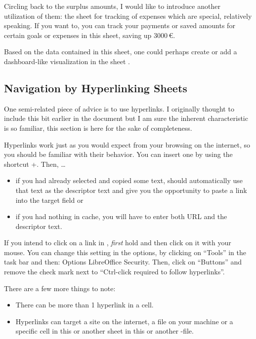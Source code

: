 Circling back to the surplus amounts, I would like to introduce another utilization of them: the sheet for tracking of expenses which are special, relatively speaking.
If you want to, you can track your payments or saved amounts for certain goals or expenses in this sheet, \ie saving up 3000\,€.

Based on the data contained in this sheet, one could perhaps create or add a dashboard-like visualization in the sheet .



\subsection{Navigation by Hyperlinking Sheets}
\label{subsec:navigation-hyperlinking-sheets}

One semi-related piece of advice is to use hyperlinks.
I originally thought to include this bit earlier in the document but I am sure the inherent characteristic is so familiar, this section is here for the sake of completeness.

Hyperlinks work just as you would expect from your browsing on the internet, so you should be familiar with their behavior.
You can insert one by using the shortcut +.
Then, \ldots
\begin{itemize}
	\item if you had already selected and copied some text, \loc should automatically use that text as the descriptor text and give you the opportunity to paste a link into the target field or
	\item if you had nothing in cache, you will have to enter both URL and the descriptor text.
\end{itemize}
If you intend to click on a link in \loc, \emph{first} hold  and then click on it with your mouse.
You can change this setting in the options, by clicking on ``Tools'' in the task bar and then: Options \structurenext LibreOffice \structurenext Security.
Then, click on ``Buttons'' and remove the check mark next to ``Ctrl-click required to follow hyperlinks''.

There are a few more things to note:
\begin{itemize}
	\item There can be more than 1 hyperlink in a cell.
	\item Hyperlinks can target a site on the internet, a file on your machine or a specific cell in this or another sheet in this or another \loc-file.
\end{itemize}

